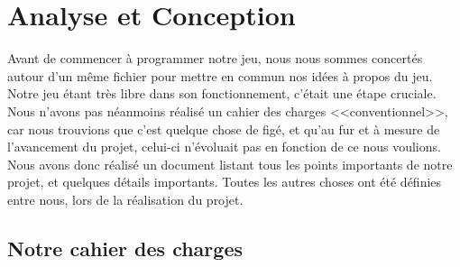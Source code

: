 \documentclass[11pt]{report}
\begin{document}
\chapter{Analyse et Conception}

	Avant de commencer à programmer notre jeu, nous nous sommes concertés autour d'un même fichier pour mettre en commun nos idées à propos du jeu. Notre jeu étant très libre dans son fonctionnement, c'était une étape cruciale.\\
	Nous n'avons pas néanmoins réalisé un cahier des charges <<conventionnel>>, car nous trouvions que c'est quelque chose de figé, et qu'au fur et à mesure de l'avancement du projet, celui-ci n'évoluait pas en fonction de ce nous voulions. Nous avons donc réalisé un document listant tous les points importants de notre projet, et quelques détails importants. Toutes les autres choses ont été définies entre nous, lors de la réalisation du projet.

	\section{Notre cahier des charges}
\end{document}
